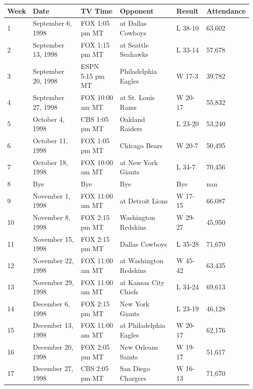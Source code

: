 \documentclass{article}
\begin{document}
\begin{tabular}{llllll}
\toprule
Week & Date & TV Time & Opponent & Result & Attendance \\
\midrule
1 & September 6, 1998 & FOX 1:05 pm MT & at Dallas Cowboys & L 38-10 & 63,602 \\
2 & September 13, 1998 & FOX 1:15 pm MT & at Seattle Seahawks & L 33-14 & 57,678 \\
3 & September 20, 1998 & ESPN 5:15 pm MT & Philadelphia Eagles & W 17-3 & 39,782 \\
4 & September 27, 1998 & FOX 10:00 am MT & at St. Louis Rams & W 20-17 & 55,832 \\
5 & October 4, 1998 & CBS 1:05 pm MT & Oakland Raiders & L 23-20 & 53,240 \\
6 & October 11, 1998 & FOX 1:05 pm MT & Chicago Bears & W 20-7 & 50,495 \\
7 & October 18, 1998 & FOX 10:00 am MT & at New York Giants & L 34-7 & 70,456 \\
8 & Bye & Bye & Bye & Bye & nan \\
9 & November 1, 1998 & FOX 11:00 am MT & at Detroit Lions & W 17-15 & 66,087 \\
10 & November 8, 1998 & FOX 2:15 pm MT & Washington Redskins & W 29-27 & 45,950 \\
11 & November 15, 1998 & FOX 2:15 pm MT & Dallas Cowboys & L 35-28 & 71,670 \\
12 & November 22, 1998 & FOX 11:00 am MT & at Washington Redskins & W 45-42 & 63,435 \\
13 & November 29, 1998 & FOX 11:00 am MT & at Kansas City Chiefs & L 34-24 & 69,613 \\
14 & December 6, 1998 & FOX 2:15 pm MT & New York Giants & L 23-19 & 46,128 \\
15 & December 13, 1998 & FOX 11:00 am MT & at Philadelphia Eagles & W 20-17 & 62,176 \\
16 & December 20, 1998 & FOX 2:05 pm MT & New Orleans Saints & W 19-17 & 51,617 \\
17 & December 27, 1998 & CBS 2:05 pm MT & San Diego Chargers & W 16-13 & 71,670 \\
\bottomrule
\end{tabular}
\end{document}
